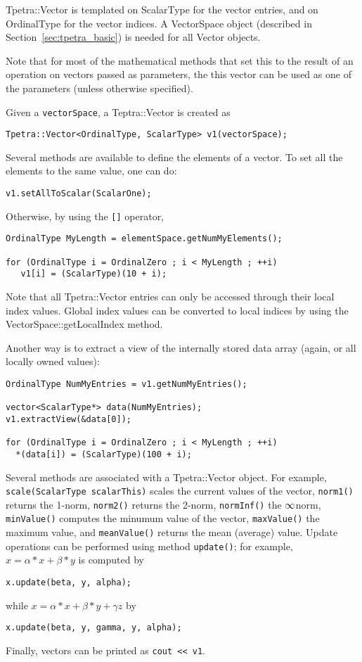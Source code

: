 Tpetra::Vector is templated on ScalarType for the vector entries, and on
OrdinalType for the vector indices. A VectorSpace object 
(described in Section~\ref{sec:tpetra_basic})  is needed for all Vector objects.

 Note that for most of the mathematical methods that set this to the result of
 an operation on vectors passed as parameters, the this vector can be used as
 one of the parameters (unless otherwise specified).

Given a {\tt vectorSpace}, a Teptra::Vector is created as
\begin{verbatim}
Tpetra::Vector<OrdinalType, ScalarType> v1(vectorSpace);
\end{verbatim}
    
Several methods are available to define the elements of a vector. 
To set all the elements to the same value, one can do:
\begin{verbatim}
v1.setAllToScalar(ScalarOne);
\end{verbatim}
Otherwise, by using the \verb![]! operator,
\begin{verbatim}
OrdinalType MyLength = elementSpace.getNumMyElements();

for (OrdinalType i = OrdinalZero ; i < MyLength ; ++i)
   v1[i] = (ScalarType)(10 + i);
\end{verbatim}
Note that all Tpetra::Vector entries can only be accessed through their local
index values.  Global index values can be converted to local indices by using
the VectorSpace::getLocalIndex method.

Another way is to extract a view of the internally stored data array
(again, or all locally owned values):
\begin{verbatim}
OrdinalType NumMyEntries = v1.getNumMyEntries();

vector<ScalarType*> data(NumMyEntries);
v1.extractView(&data[0]); 
                        
for (OrdinalType i = OrdinalZero ; i < MyLength ; ++i)
  *(data[i]) = (ScalarType)(100 + i);
\end{verbatim}

Several methods are associated with a Tpetra::Vector object. For example,
  \verb!scale(ScalarType scalarThis)! scales the current values of the
  vector, \verb!norm1()! returns the 1-norm, \verb!norm2()! returns the
  2-norm, \verb!normInf()! the $\infty\-$norm, \verb!minValue()! computes the
  minumum value of the vector, \verb!maxValue()! the maximum value, and
  \verb!meanValue()! returns the mean (average) value. Update operations can
  be performed using method \verb!update()!; for example, $x = \alpha * x +
  \beta * y$ is computed by
\begin{verbatim}
x.update(beta, y, alpha); 
\end{verbatim}
while $x = \alpha * x + \beta * y + \gamma z$   by
\begin{verbatim}
x.update(beta, y, gamma, y, alpha); 
\end{verbatim}
Finally, vectors can be printed as \verb!cout << v1!.


